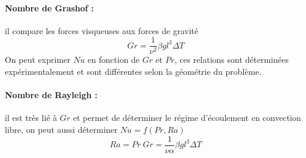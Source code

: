 \paragraph{Nombre de Grashof :}il compare les forces visqueuses aux forces de gravité
%
\begin{equation}
Gr = \frac{1}{\nu^2}\beta g l^3 \Delta T
\end{equation}
%
On peut exprimer $Nu$ en fonction de $Gr$ et $Pr$, ces relations sont déterminées expérimentalement et sont différentes selon la géométrie du problème.

\paragraph{Nombre de Rayleigh :}il est très lié à $Gr$ et permet de déterminer le régime d'écoulement en convection libre, on peut aussi déterminer $Nu = f(Pr,Ra)$
%
\begin{equation}
Ra = Pr~Gr = \frac{1}{\nu\alpha}\beta g l^3 \Delta T
\end{equation}
